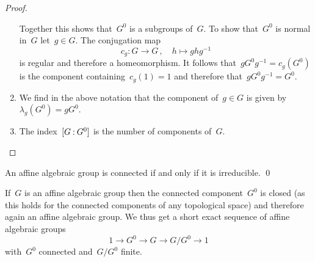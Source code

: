 \begin{proof}
\begin{enumerate}
      Together this shows that~$G^0$ is a subgroups of~$G$.
      To show that~$G^0$ is normal in~$G$ let~$g \in G$.
      The conjugation map
      \[
                c_g
        \colon  G
        \to     G \,,
        \quad   h
        \mapsto g h g^{-1}
      \]
      is regular and therefore a homeomorphism.
      It follows that~$g G^0 g^{-1} = c_g(G^0)$ is the component containing~$c_g(1) = 1$ and therefore that~$g G^0 g^{-1} = G^0$.
    \item
      We find in the above notation that the component of~$g \in G$ is given by~$\lambda_g( G^0 ) = g G^0$.
    \item
      The index~$[G \mathbin{:} G^0]$ is the number of components of~$G$.
    \qedhere
  \end{enumerate}
\end{proof}


\begin{corollary}
  An affine algebraic group is connected if and only if it is irreducible.
  \qed
\end{corollary}


\begin{fluff}
  If~$G$ is an affine algebraic group then the connected component~$G^0$ is closed (as this holds for the connected components of any topological space) and therefore again an affine algebraic group.
  We thus get a short exact sequence of affine algebraic groups
  \[
        1
    \to G^0
    \to G
    \to G/G^0
    \to 1
  \]
  with~$G^0$ connected and~$G/G^0$ finite.
\end{fluff}



